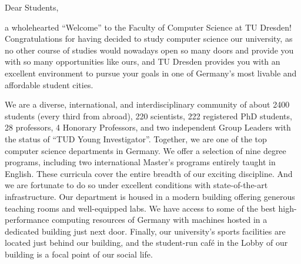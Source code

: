 {\fontsize{10pt}{11}\selectfont
{}
Dear Students,

a wholehearted \enquote{Welcome} to the Faculty of Computer Science at TU Dresden! Congratulations for having decided to study computer science our university, as no other course of studies would nowadays open so many doors and provide you with so many opportunities like ours, and TU Dresden provides you with an excellent environment to pursue your goals in one of Germany’s most livable and affordable student cities.

We are a diverse, international, and interdisciplinary community of about 2400 students (every third from abroad), 220 scientists, 222 registered PhD students, 28 professors, 4 Honorary Professors, and two independent Group Leaders with the status of \enquote{TUD Young Investigator}. Together, we are one of the top computer science departments in Germany. We offer a selection of nine degree programs, including two international Master’s programs entirely taught in English. These curricula cover the entire breadth of our exciting discipline. And we are fortunate to do so under excellent conditions with state-of-the-art infrastructure. Our department is housed in a modern building offering generous teaching rooms and well-equipped labs. We have access to some of the best high-performance computing resources of Germany with machines hosted in a dedicated building just next door. Finally, our university's sports facilities are located just behind our building, and the student-run café \ascii{} in the Lobby of our building is a focal point of our social life.

}
